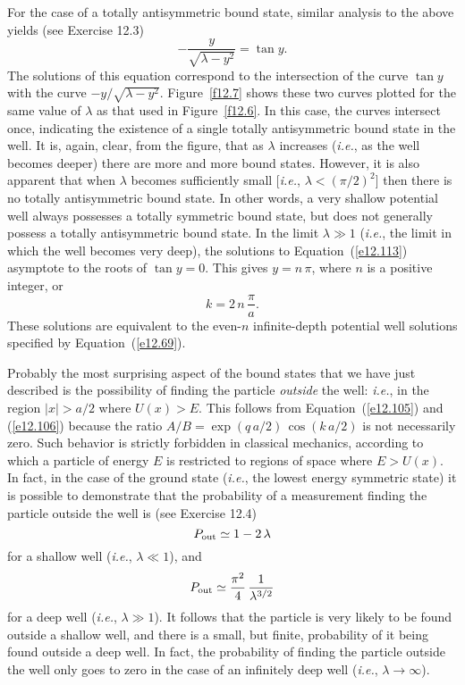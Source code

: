 For the case of a totally antisymmetric bound state, similar analysis to the
above yields (see Exercise 12.3)
\begin{equation}\label{e12.113}
-\frac{y}{\sqrt{\lambda-y^2}} = \tan y.
\end{equation}
The solutions of this equation correspond to the intersection of the
curve $\tan y$ with the curve  $-y/\sqrt{\lambda-y^2}$. Figure~\ref{f12.7} shows these two curves plotted for
the same value of $\lambda$ as that used in Figure~\ref{f12.6}. In this
case, the curves intersect once, indicating the existence of
a single totally antisymmetric bound state in the well. It is, again, clear, from the figure, that as $\lambda$ increases ({\em i.e.}, as the well becomes
deeper) there are more and more bound states. However, it is also apparent that
when $\lambda$ becomes sufficiently small [{\em i.e.}, $\lambda < (\pi/2)^2$] then there is no totally
antisymmetric bound state. In other words, a very shallow potential well
always possesses a totally symmetric bound state, but does not generally
possess a totally antisymmetric bound state. In the limit $\lambda\gg 1$
({\em i.e.}, the limit in which the well becomes very deep), the
solutions to Equation~(\ref{e12.113}) asymptote to the roots of $\tan y =0$.
This gives $y = n\,\pi$, where $n$ is a positive integer, or
\begin{equation}
k= 2\,n\,\frac{\pi}{a}.
\end{equation}
These solutions are equivalent to the even-$n$ infinite-depth potential well solutions 
specified by Equation~(\ref{e12.69}).

Probably the most surprising aspect of the bound states that we have just
described is the possibility  of finding the particle {\em outside}\/ the well: {\em
i.e.}, in the region $|x|>a/2$ where $U(x)>E$. This follows from Equation~(\ref{e12.105}) and (\ref{e12.106}) 
because the ratio $A/B= \exp(q\,a/2)\,\cos(k\,a/2)$ is not necessarily zero.
Such behavior is strictly forbidden
in classical mechanics, according to which  a  particle of energy $E$ is restricted to
regions of space where $E>U(x)$. In fact, in the case of the ground state ({\em i.e.}, the lowest
energy symmetric state) it is possible to demonstrate that the probability of a
measurement finding the particle outside the well is (see Exercise 12.4)
\begin{equation}
P_{\rm out}\simeq 1-2\,\lambda
\end{equation}
for a shallow well ({\em i.e.}, $\lambda\ll 1$), and
\begin{equation}
P_{\rm out}\simeq \frac{\pi^2}{4}\,\frac{1}{\lambda^{3/2}}
\end{equation}
for a deep well ({\em i.e.}, $\lambda\gg 1$). It follows that the particle is very likely to be found outside a shallow well, and there is a small, but finite, probability of it being found outside a deep well.
In fact, the probability of
finding the particle outside the well only goes to zero   in the case of an infinitely deep well ({\em i.e.}, $\lambda\rightarrow \infty$).


